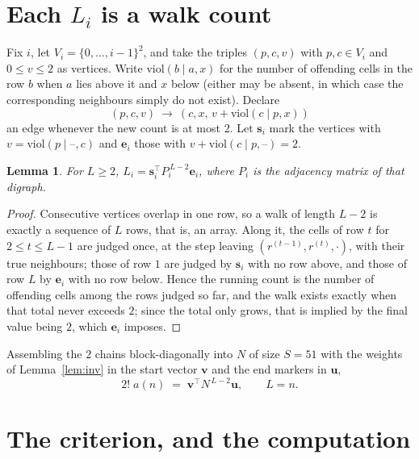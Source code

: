 \documentclass[11pt,a4paper]{article}
\theoremstyle{plain}
\newtheorem{lemma}[theorem]{Lemma}
\theoremstyle{definition}
\begin{document}
\section{Each $L_i$ is a walk count}

Fix $i$, let $V_i=\{0,\dots,i-1\}^{2}$, and take the triples $(p,c,v)$ with
$p,c\in V_i$ and $0\le v\le2$ as vertices. Write $\mathrm{viol}(b\mid a,x)$ for the number
of offending cells in the row $b$ when $a$ lies above it and $x$ below (either may be
absent, in which case the corresponding neighbours simply do not exist). Declare
\[
(p,c,v)\ \longrightarrow\ (c,x,\,v+\mathrm{viol}(c\mid p,x))
\]
an edge whenever the new count is at most $2$. Let $\mathbf{s}_i$ mark the vertices with
$v=\mathrm{viol}(p\mid\text{--},c)$ and $\mathbf{e}_i$ those with
$v+\mathrm{viol}(c\mid p,\text{--})=2$.

\begin{lemma}\label{lem:walk}
For $L\ge2$, $L_i=\mathbf{s}_i^{\!\top}P_i^{\,L-2}\mathbf{e}_i$, where $P_i$ is the
adjacency matrix of that digraph.
\end{lemma}

\begin{proof}
Consecutive vertices overlap in one row, so a walk of length $L-2$ is exactly a sequence
of $L$ rows, that is, an array. Along it, the cells of row $t$ for $2\le t\le L-1$ are
judged once, at the step leaving $(r^{(t-1)},r^{(t)},\cdot)$, with their true neighbours;
those of row $1$ are judged by $\mathbf{s}_i$ with no row above, and those of row
$L$ by $\mathbf{e}_i$ with no row below. Hence the running count is the number of
offending cells among the rows judged so far, and the walk exists exactly when that total
never exceeds $2$; since the total only grows, that is implied by the final value being
$2$, which $\mathbf{e}_i$ imposes.
\end{proof}

Assembling the $2$ chains block-diagonally into $N$ of size $S=51$ with the weights of
Lemma~\ref{lem:inv} in the start vector $\mathbf{v}$ and the end markers in
$\mathbf{u}$,
\begin{equation}\label{eq:walk2}
2!\;a(n)\;=\;\mathbf{v}^{\!\top}N^{\,L-2}\mathbf{u},\qquad L=n .
\end{equation}

\section{The criterion, and the computation}
\end{document}

